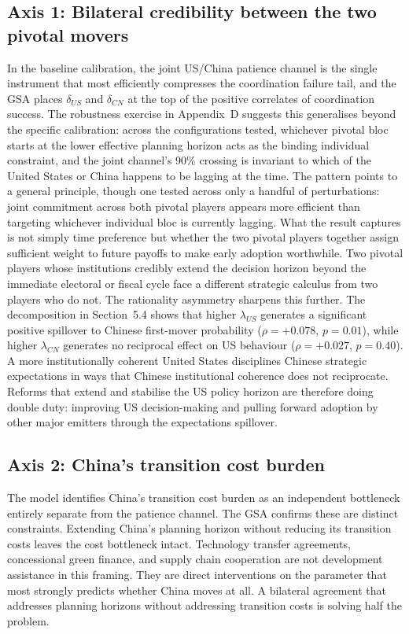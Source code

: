 \documentclass[10pt,a4paper]{article}
\begin{document}
\subsection{Axis 1: Bilateral credibility between the two pivotal movers}

In the baseline calibration, the joint US/China patience channel is the single instrument that most efficiently compresses the coordination failure tail, and the GSA places $\delta_{US}$ and $\delta_{CN}$ at the top of the positive correlates of coordination success. The robustness exercise in Appendix~D suggests this generalises beyond the specific calibration: across the configurations tested, whichever pivotal bloc starts at the lower effective planning horizon acts as the binding individual constraint, and the joint channel's 90\% crossing is invariant to which of the United States or China happens to be lagging at the time. The pattern points to a general principle, though one tested across only a handful of perturbations: joint commitment across both pivotal players appears more efficient than targeting whichever individual bloc is currently lagging. What the result captures is not simply time preference but whether the two pivotal players together assign sufficient weight to future payoffs to make early adoption worthwhile. Two pivotal players whose institutions credibly extend the decision horizon beyond the immediate electoral or fiscal cycle face a different strategic calculus from two players who do not.
The rationality asymmetry sharpens this further. The decomposition in Section~5.4 shows that
higher $\lambda_{US}$ generates a significant positive spillover to Chinese first-mover probability
($\rho = +0.078$, $p = 0.01$), while higher $\lambda_{CN}$ generates no reciprocal effect on US behaviour
($\rho = +0.027$, $p = 0.40$). A more institutionally coherent United States disciplines Chinese
strategic expectations in ways that Chinese institutional coherence does not reciprocate. Reforms
that extend and stabilise the US policy horizon are therefore doing double duty: improving US
decision-making and pulling forward adoption by other major emitters through the expectations
spillover.

\subsection{Axis 2: China's transition cost burden}

The model identifies China's transition cost burden as an independent bottleneck entirely
separate from the patience channel. The GSA confirms these are distinct constraints. Extending
China's planning horizon without reducing its transition costs leaves the cost bottleneck intact.
Technology transfer agreements, concessional green finance, and supply chain cooperation are not
development assistance in this framing. They are direct interventions on the parameter that most strongly
predicts whether China moves at all. A bilateral agreement that addresses planning horizons without
addressing transition costs is solving half the problem.
\end{document}
